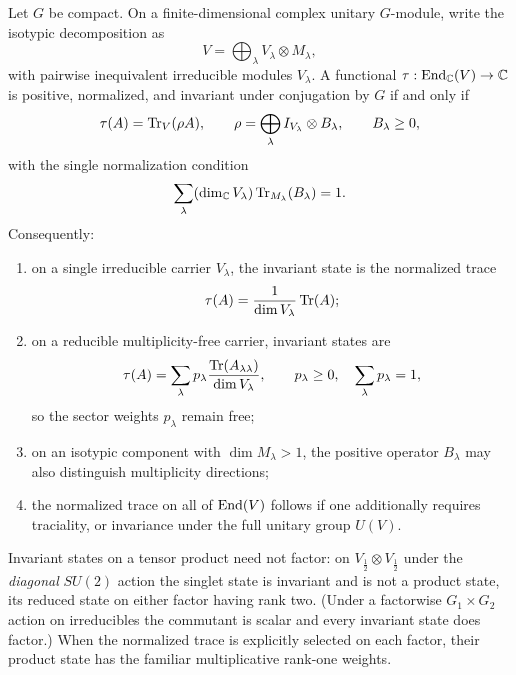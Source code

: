 \documentclass[12pt,a4paper]{article}
\begin{document}
\begin{theorem}
\label{p2:thm:no-insertion-finite-trace-weight}
Let \(G\) be compact.  On a finite-dimensional complex unitary \(G\)-module,
write the isotypic decomposition as
\[
V=\bigoplus_{\lambda}V_\lambda\otimes M_\lambda,
\]
with pairwise inequivalent irreducible modules \(V_\lambda\).
A functional \(\tau:\operatorname{End}_{\mathbb C}(V)\to\mathbb C\) is positive,
normalized, and invariant under conjugation by \(G\) if and only if
\[
\tau(A)=\operatorname{Tr}_V(\rho A),
\qquad
\rho=\bigoplus_\lambda
I_{V_\lambda}\otimes B_\lambda,
\qquad
B_\lambda\ge0,
\]
with the single normalization condition
\[
\sum_\lambda
(\dim_{\mathbb C}V_\lambda)\operatorname{Tr}_{M_\lambda}(B_\lambda)=1.
\]
Consequently:
\begin{enumerate}[label=(\roman*), leftmargin=2em]
\item on a single irreducible carrier \(V_\lambda\), the invariant state is
the normalized trace
\[
\tau(A)=\frac1{\dim V_\lambda}\operatorname{Tr}(A);
\]
\item on a reducible multiplicity-free carrier, invariant states are
\[
\tau(A)=\sum_\lambda p_\lambda
\frac{\operatorname{Tr}(A_{\lambda\lambda})}{\dim V_\lambda},
\qquad
p_\lambda\ge0,\quad\sum_\lambda p_\lambda=1,
\]
so the sector weights \(p_\lambda\) remain free;
\item on an isotypic component with \(\dim M_\lambda>1\), the positive
operator \(B_\lambda\) may also distinguish multiplicity directions;
\item the normalized trace on all of \(\operatorname{End}(V)\) follows if one additionally
requires traciality, or invariance under the full unitary group \(U(V)\).
\end{enumerate}
Invariant states on a tensor product need not factor: on
\(V_{\frac12}\otimes V_{\frac12}\) under the \emph{diagonal} \(SU(2)\)
action the singlet state is invariant and is not a product state, its
reduced state on either factor having rank two.  (Under a factorwise
\(G_1\times G_2\) action on irreducibles the commutant is scalar and every
invariant state does factor.)  When the normalized
trace is explicitly selected on each factor, their product state has the
familiar multiplicative rank-one weights.
\end{theorem}
\end{document}
